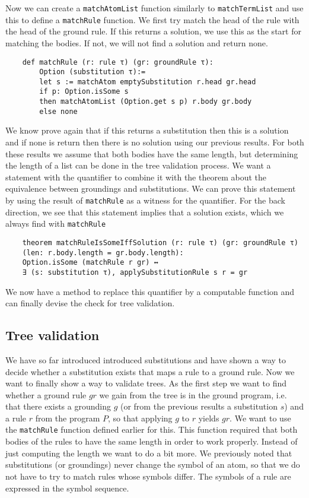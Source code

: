 Now we can create a \texttt{matchAtomList} function similarly to \texttt{matchTermList} and use this to define a \texttt{matchRule} function. We first try match the head of the rule with the head of the ground rule. If this returns a solution, we use this as the start for matching the bodies. If not, we will not find a solution and return none.

\begin{lstlisting}
    def matchRule (r: rule τ) (gr: groundRule τ):
        Option (substitution τ):=
        let s := matchAtom emptySubstitution r.head gr.head
        if p: Option.isSome s
        then matchAtomList (Option.get s p) r.body gr.body
        else none

\end{lstlisting}

We know prove again that if this returns a substitution then this is a solution and if none is return then there is no solution using our previous results. For both these results we assume that both bodies have the same length, but determining the length of a list can be done in the tree validation process.
We want a statement with the quantifier to combine it with the theorem about the equivalence between groundings and substitutions. We can prove this statement by using the result of \texttt{matchRule} as a witness for the quantifier. For the back direction, we see that this statement implies that a solution exists, which we always find with \texttt{matchRule}

\begin{lstlisting}
    theorem matchRuleIsSomeIffSolution (r: rule τ) (gr: groundRule τ) 
    (len: r.body.length = gr.body.length): 
    Option.isSome (matchRule r gr) ↔ 
    ∃ (s: substitution τ), applySubstitutionRule s r = gr
\end{lstlisting}

We now have a method to replace this quantifier by a computable function and can finally devise the check for tree validation.

\subsection{Tree validation}

We have so far introduced introduced substitutions and have shown a way to decide whether a substitution exists that maps a rule to a ground rule. Now we want to finally show a way to validate trees. As the first step we want to find whether a ground rule $gr$ we gain from the tree is in the ground program, i.e. that there exists a grounding $g$ (or from the previous results a substitution $s$) and a rule $r$ from the program $P$, so that applying $g$ to $r$ yields $gr$. We want to use the \texttt{matchRule} function defined earlier for this. This function required that both bodies of the rules to have the same length in order to work properly. Instead of just computing the length we want to do a bit more. We previously noted that substitutions (or groundings) never change the symbol of an atom, so that we do not have to try to match rules whose symbols differ. The symbols of a rule are expressed in the symbol sequence.

